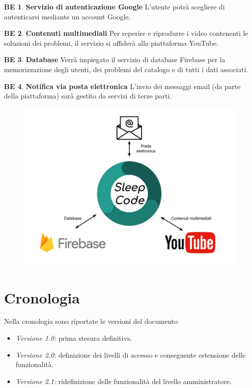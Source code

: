 \documentclass[11pt, a4paper]{article}
\theoremstyle{definition}
\newtheorem{backend}{BE}
\begin{document}
\begin{backend}
\textbf{Servizio di autenticazione Google }
L'utente potrà scegliere di autenticarsi mediante un account Google.
\end{backend}

\begin{backend}
\textbf{Contenuti multimediali }
Per reperire e riprodurre i video contenenti le soluzioni dei problemi,
il servizio si affiderà alla piattaforma YouTube.
\end{backend}

\begin{backend}
\textbf{Database }
Verrà impiegato il servizio di database Firebase per la memorizzazione
degli utenti, dei problemi del catalogo e di tutti i dati associati.
\end{backend}

\begin{backend}
\textbf{Notifica via posta elettronica }
L'invio dei messaggi email (da parte della piattaforma) sarà gestito da servizi di terze parti.
\end{backend}

\begin{figure}[H]
\centering
\includegraphics[scale=0.35]{materiale/backend.jpg}
\end{figure}

\newpage
\section{Cronologia}
Nella cronologia sono riportate le versioni del documento
\begin{itemize}
    \item \textit{Versione 1.0:} prima stesura definitiva.
    \item \textit{Versione 2.0:} definizione dei livelli di accesso e conseguente estensione delle funzionalità.
    \item \textit{Versione 2.1:} ridefinizione delle funzionalità del livello amministratore.
\end{itemize}
\end{document}
